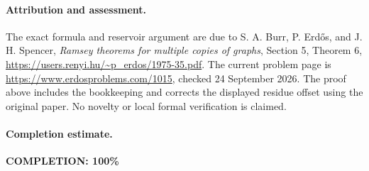 \paragraph{Attribution and assessment.}
The exact formula and reservoir argument are due to S. A. Burr, P. Erd\H{o}s, and J. H. Spencer, \emph{Ramsey theorems for multiple copies of graphs}, Section 5, Theorem 6, \url{https://users.renyi.hu/~p_erdos/1975-35.pdf}. The current problem page is \url{https://www.erdosproblems.com/1015}, checked 24 September 2026. The proof above includes the bookkeeping and corrects the displayed residue offset using the original paper. No novelty or local formal verification is claimed.

\paragraph{Completion estimate.}
\textbf{COMPLETION: 100\%}

